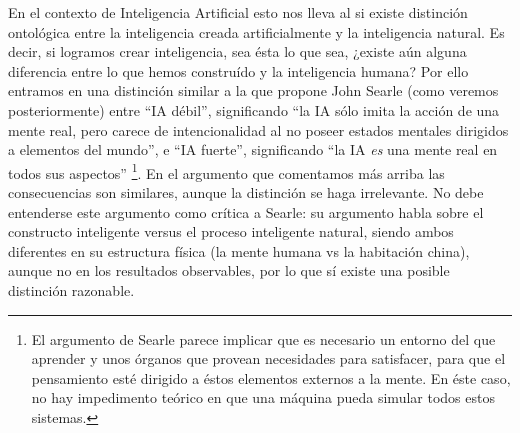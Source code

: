 \documentclass[12pt]{memoir}
\begin{document}
En el contexto de Inteligencia Artificial esto nos lleva al si existe distinción ontológica entre la inteligencia creada artificialmente y la inteligencia natural. Es decir, si logramos crear inteligencia, sea ésta lo que sea, ¿existe aún alguna diferencia entre lo que hemos construído y la inteligencia humana? Por ello entramos en una distinción similar a la que propone John Searle (como veremos posteriormente) entre ``IA débil'', significando ``la IA sólo imita la acción de una mente real, pero carece de intencionalidad al no poseer estados mentales dirigidos a elementos del mundo'', e ``IA fuerte'', significando ``la IA \textit{es} una mente real en todos sus aspectos'' \parencite{searleChineseRoom}\footnote{El argumento de Searle parece implicar que es necesario un entorno del que aprender y unos órganos que provean necesidades para satisfacer, para que el pensamiento esté dirigido a éstos elementos externos a la mente. En éste caso, no hay impedimento teórico en que una máquina pueda simular todos estos sistemas.}. En el argumento que comentamos más arriba las consecuencias son similares, aunque la distinción se haga irrelevante. No debe entenderse este argumento como crítica a Searle: su argumento habla sobre el constructo inteligente versus el proceso inteligente natural, siendo ambos diferentes en su estructura física (la mente humana vs la habitación china), aunque no en los resultados observables, por lo que sí existe una posible distinción razonable.
\end{document}
